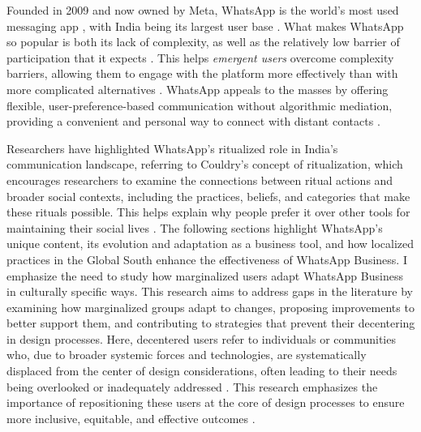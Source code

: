 Founded in 2009 and now owned by Meta, WhatsApp is the world's most used messaging app \cite{dixon2024}, with India being its largest user base \cite{nair2024}. What makes WhatsApp so popular is both its lack of complexity, as well as the relatively low barrier of participation that it expects \cite{10.1145/3014362.3014367, Pang2020, Garimella2024}. This helps \textit{emergent users} overcome complexity barriers, allowing them to engage with the platform more effectively than with more complicated alternatives \cite{10.1145/3014362.3014367, 10.1145/2493190.2493225}. WhatsApp appeals to the masses by offering flexible, user-preference-based communication without algorithmic mediation, providing a convenient and personal way to connect with distant contacts \cite{10.1145/3512964, 10.1145/2531602.2531679}. 

Researchers have highlighted WhatsApp's ritualized role in India's communication landscape, referring to Couldry's \cite{rothenbuhler2005media} concept of ritualization, which encourages researchers to examine the connections between ritual actions and broader social contexts, including the practices, beliefs, and categories that make these rituals possible. This helps explain why people prefer it over other tools for maintaining their social lives \cite{doi:10.1177/01968599221095177}. The following sections highlight WhatsApp's unique content, its evolution and adaptation as a business tool, and how localized practices in the Global South enhance the effectiveness of WhatsApp Business. I emphasize the need to study how marginalized users adapt WhatsApp Business in culturally specific ways. This research aims to address gaps in the literature by examining how marginalized groups adapt to changes, proposing improvements to better support them, and contributing to strategies that prevent their decentering in design processes. Here, decentered users refer to individuals or communities who, due to broader systemic forces and technologies, are systematically displaced from the center of design considerations, often leading to their needs being overlooked or inadequately addressed \cite{belfer_center_design_from_the_margins}. This research emphasizes the importance of repositioning these users at the core of design processes to ensure more inclusive, equitable, and effective outcomes \cite{belfer_center_design_from_the_margins_2}.


